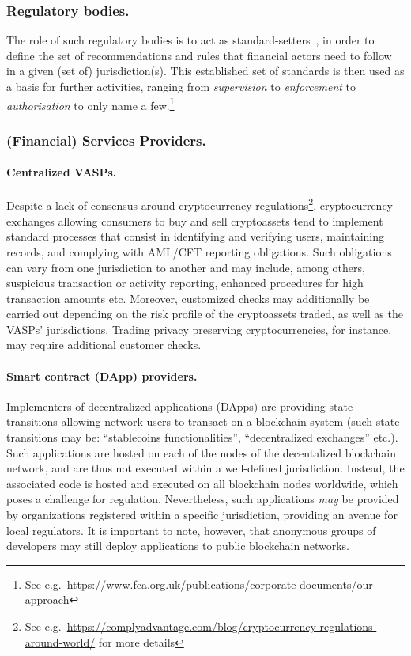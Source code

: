 \documentclass[runningheads,10pt]{llncs}
\numberwithin{equation}{section}
\begin{document}
\subsubsection{Regulatory bodies.}
The role of such regulatory bodies is to act as standard-setters~\cite{role-sec}, in
order to define the set of recommendations and rules that financial actors need to
follow in a given (set of) jurisdiction(s). This established set of standards is then
used as a basis for further activities, ranging from \emph{supervision} to
\emph{enforcement} to \emph{authorisation} to only name a few.\footnote{See
  e.g.~\url{https://www.fca.org.uk/publications/corporate-documents/our-approach}}

\subsubsection{(Financial) Services Providers.}
\paragraph{Centralized VASPs.} Despite a lack of consensus around
cryptocurrency regulations\footnote{See
  e.g.~\url{https://complyadvantage.com/blog/cryptocurrency-regulations-around-world/}
  for more details}, cryptocurrency exchanges allowing consumers to buy and sell
cryptoassets tend to implement standard processes that consist in identifying
and verifying users, maintaining records, and complying with AML/CFT reporting
obligations. Such obligations can vary from one jurisdiction to another and may
include, among others, suspicious transaction or activity reporting, enhanced
procedures for high transaction amounts etc.  Moreover, customized checks may
additionally be carried out depending on the risk profile of the cryptoassets
traded, as well as the VASPs' jurisdictions. Trading privacy preserving
cryptocurrencies, for instance, may require additional customer checks.

\paragraph{Smart contract (DApp) providers.} Implementers of decentralized
applications (DApps) are providing state transitions allowing network users to
transact on a blockchain system (such state transitions may be: ``stablecoins
functionalities'', ``decentralized exchanges'' etc.).  Such applications are
hosted on each of the nodes of the decentalized blockchain network, and are thus
not executed within a well-defined jurisdiction.  Instead, the associated code
is hosted and executed on all blockchain nodes worldwide, which poses a
challenge for regulation. Nevertheless, such applications \emph{may} be provided
by organizations registered within a specific jurisdiction, providing an avenue
for local regulators. It is important to note, however, that anonymous groups of
developers may still deploy applications to public blockchain networks.
\end{document}

